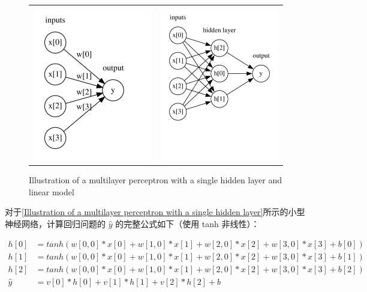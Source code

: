 \begin{figure}[h]
    \centering
    \begin{tabular}{cc}
        \includegraphics[page=1,width=.45\textwidth]{../Codes/Figures/Visualization of logistic regression.pdf} &
        \includegraphics[page=1,width=.45\textwidth]{../Codes/Figures/Illustration of a multilayer perceptron with a single hidden layer.pdf} \\
    \end{tabular}
    \caption{Illustration of a multilayer perceptron with a single hidden layer and linear model}
    \label{Illustration of a multilayer perceptron with a single hidden layer}
\end{figure}

对于\autoref{Illustration of a multilayer perceptron with a single hidden layer}所示的小型神经网络，计算回归问题的 $\hat{y}$ 的完整公式如下（使用 tanh 非线性）：

\begin{equation*}
    \begin{split}
        h[0]    & = tanh(w[0, 0] * x[0] + w[1, 0] * x[1] + w[2, 0] * x[2] + w[3, 0] * x[3] + b[0]) \\
        h[1]    & = tanh(w[0, 0] * x[0] + w[1, 0] * x[1] + w[2, 0] * x[2] + w[3, 0] * x[3] + b[1]) \\
        h[2]    & = tanh(w[0, 0] * x[0] + w[1, 0] * x[1] + w[2, 0] * x[2] + w[3, 0] * x[3] + b[2]) \\
        \hat{y} & = v[0] * h[0] + v[1] * h[1] + v[2] * h[2] + b                                    \\
    \end{split}
\end{equation*}

